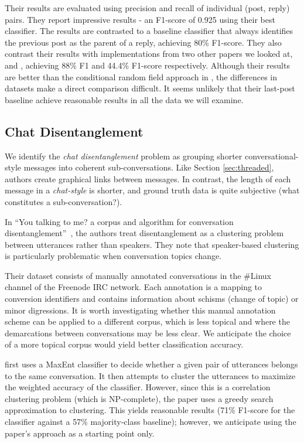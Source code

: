 \documentclass[11pt]{article}
\newcommand{\titlecite}[2]{``#1''~\cite{#2}}
\begin{document}
Their results are evaluated using precision and recall of individual
(post, reply) pairs. They report impressive results - an F1-score of 0.925 using their best
classifier. The results are contrasted to a baseline classifier that always
identifies the previous post as the parent of a reply, achieving 80\% F1-score. 
They also contrast their results with implementations from two other papers we looked at,
\cite{Elsner2008a} and \cite{Wang2008a}, achieving 88\% F1 and 44.4\% F1-score
respectively. Although their results are better than the conditional random field approach 
in \cite{Wang2011a}, the differences in datasets make a direct comparison difficult.
It seems unlikely that their last-post baseline achieve reasonable results in 
all the data we will examine.

\subsection{Chat Disentanglement}
\label{sec:chat}
We identify the \textit{chat disentanglement} problem as grouping
shorter conversational-style messages into coherent sub-conversations. Like 
Section \ref{sec:threaded}, authors create graphical links between messages. 
In contrast, the length of each message in a \textit{chat-style} is shorter, 
and ground truth data is quite subjective (what constitutes a sub-conversation?).

In \titlecite{You talking to me? a corpus and algorithm for conversation
disentanglement}{Elsner2008a}, the authors treat disentanglement as a clustering problem between 
utterances rather than speakers. They note that speaker-based clustering is
particularly problematic when conversation topics change.

Their dataset consists of manually annotated conversations in the \#Linux channel of 
the Freenode IRC network. Each annotation is a mapping to conversion identifiers
and contains information about schisms (change of 
topic) or minor digressions. It is worth investigating whether this 
manual annotation scheme can be applied to a different corpus, 
which is less topical and where the demarcations between conversations 
may be less clear. We anticipate the choice
of a more topical corpus would yield better classification accuracy.

\cite{Elsner2008a} first uses a MaxEnt classifier to decide whether a given pair of
utterances belongs to the same conversation. It then attempts to cluster the
utterances to maximize the weighted accuracy of the classifier. However, since
this is a correlation clustering problem (which is NP-complete), the paper uses
a greedy search approximation to clustering. This yields reasonable
results (71\% F1-score for the classifier against a 57\% majority-class baseline); 
however, we anticipate using the paper's approach as a starting point only.
\end{document}

